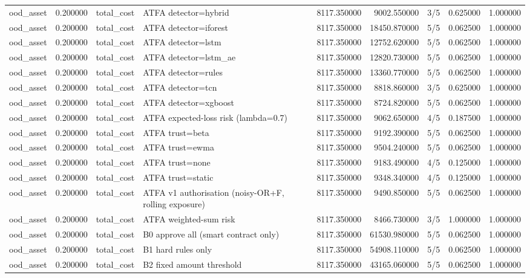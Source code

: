 \begin{tabular}{lrllrrlrr}
ood\_asset & 0.200000 & total\_cost & ATFA detector=hybrid & 8117.350000 & 9002.550000 & 3/5 & 0.625000 & 1.000000 \\
ood\_asset & 0.200000 & total\_cost & ATFA detector=iforest & 8117.350000 & 18450.870000 & 5/5 & 0.062500 & 1.000000 \\
ood\_asset & 0.200000 & total\_cost & ATFA detector=lstm & 8117.350000 & 12752.620000 & 5/5 & 0.062500 & 1.000000 \\
ood\_asset & 0.200000 & total\_cost & ATFA detector=lstm\_ae & 8117.350000 & 12820.730000 & 5/5 & 0.062500 & 1.000000 \\
ood\_asset & 0.200000 & total\_cost & ATFA detector=rules & 8117.350000 & 13360.770000 & 5/5 & 0.062500 & 1.000000 \\
ood\_asset & 0.200000 & total\_cost & ATFA detector=tcn & 8117.350000 & 8818.860000 & 3/5 & 0.625000 & 1.000000 \\
ood\_asset & 0.200000 & total\_cost & ATFA detector=xgboost & 8117.350000 & 8724.820000 & 5/5 & 0.062500 & 1.000000 \\
ood\_asset & 0.200000 & total\_cost & ATFA expected-loss risk (lambda=0.7) & 8117.350000 & 9062.650000 & 4/5 & 0.187500 & 1.000000 \\
ood\_asset & 0.200000 & total\_cost & ATFA trust=beta & 8117.350000 & 9192.390000 & 5/5 & 0.062500 & 1.000000 \\
ood\_asset & 0.200000 & total\_cost & ATFA trust=ewma & 8117.350000 & 9504.240000 & 5/5 & 0.062500 & 1.000000 \\
ood\_asset & 0.200000 & total\_cost & ATFA trust=none & 8117.350000 & 9183.490000 & 4/5 & 0.125000 & 1.000000 \\
ood\_asset & 0.200000 & total\_cost & ATFA trust=static & 8117.350000 & 9348.340000 & 4/5 & 0.125000 & 1.000000 \\
ood\_asset & 0.200000 & total\_cost & ATFA v1 authorisation (noisy-OR+F, rolling exposure) & 8117.350000 & 9490.850000 & 5/5 & 0.062500 & 1.000000 \\
ood\_asset & 0.200000 & total\_cost & ATFA weighted-sum risk & 8117.350000 & 8466.730000 & 3/5 & 1.000000 & 1.000000 \\
ood\_asset & 0.200000 & total\_cost & B0 approve all (smart contract only) & 8117.350000 & 61530.980000 & 5/5 & 0.062500 & 1.000000 \\
ood\_asset & 0.200000 & total\_cost & B1 hard rules only & 8117.350000 & 54908.110000 & 5/5 & 0.062500 & 1.000000 \\
ood\_asset & 0.200000 & total\_cost & B2 fixed amount threshold & 8117.350000 & 43165.060000 & 5/5 & 0.062500 & 1.000000 \\

\end{tabular}
